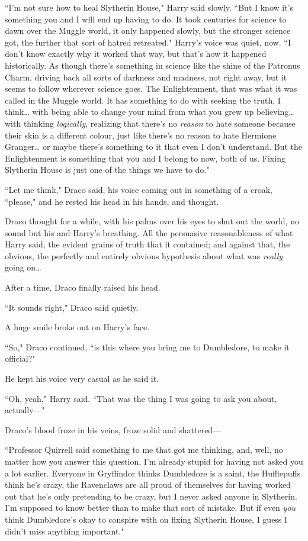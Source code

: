 ``I'm not sure how to heal Slytherin House," Harry said slowly. ``But I know it's something you and I will end up having to do. It took centuries for science to dawn over the Muggle world, it only happened slowly, but the stronger science got, the further that sort of hatred retreated." Harry's voice was quiet, now. ``I don't know exactly why it worked that way, but that's how it happened historically. As though there's something in science like the shine of the Patronus Charm, driving back all sorts of darkness and madness, not right away, but it seems to follow wherever science goes. The Enlightenment, that was what it was called in the Muggle world. It has something to do with seeking the truth, I think{\ldots} with being able to change your mind from what you grew up believing{\ldots} with thinking \emph{logically}, realizing that there's no \emph{reason} to hate someone because their skin is a different colour, just like there's no reason to hate Hermione Granger{\ldots} or maybe there's something to it that even I don't understand. But the Enlightenment is something that you and I belong to now, both of us. Fixing Slytherin House is just one of the things we have to do."

``Let me think," Draco said, his voice coming out in something of a croak, ``please," and he rested his head in his hands, and thought.

\later

Draco thought for a while, with his palms over his eyes to shut out the world, no sound but his and Harry's breathing. All the persuasive reasonableness of what Harry said, the evident grains of truth that it contained; and against that, the obvious, the perfectly and entirely obvious hypothesis about what was \emph{really} going on{\ldots}

After a time, Draco finally raised his head.

``It sounds right," Draco said quietly.

A huge smile broke out on Harry's face.

``So," Draco continued, ``is this where you bring me to Dumbledore, to make it official?"

He kept his voice very casual as he said it.

``Oh, yeah," Harry said. ``That was the thing I was going to ask you about, actually—"

Draco's blood froze in his veins, froze solid and shattered—

``Professor Quirrell said something to me that got me thinking, and, well, no matter how you answer this question, I'm already stupid for having not asked you a lot earlier. Everyone in Gryffindor thinks Dumbledore is a saint, the Hufflepuffs think he's crazy, the Ravenclaws are all proud of themselves for having worked out that he's only pretending to be crazy, but I never asked anyone in Slytherin. I'm supposed to know better than to make that sort of mistake. But if even \emph{you} think Dumbledore's okay to conspire with on fixing Slytherin House, I guess I didn't miss anything important."

